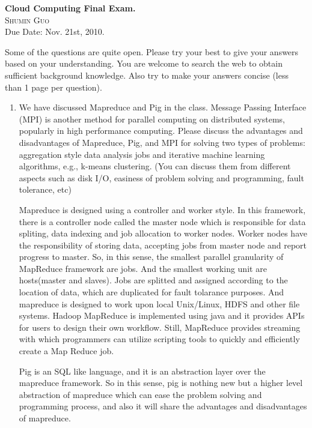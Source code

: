 \documentclass{article}
\begin{document}
\begin{center}
\textbf{\textup{\LARGE Cloud Computing Final Exam.}} \\
\textsc{Shumin Guo} \\
\small{Due Date: Nov. 21st, 2010.}
\end{center}

Some of the questions are quite open. Please try your best to give
your answers based on your understanding. You are welcome to search
the web to obtain sufficient background knowledge. Also try to make
your answers concise (less than 1 page per question).   

\begin{enumerate}
\item We have discussed Mapreduce and Pig in the class. Message Passing
Interface (MPI) is another method for parallel computing on
distributed systems, popularly in high performance computing. Please
discuss the advantages and disadvantages of Mapreduce, Pig, and MPI
for solving two types of problems: aggregation style data analysis
jobs and iterative machine learning algorithms, e.g., k-means
clustering. (You can discuss them from different aspects such as disk
I/O, easiness of problem solving and programming, fault tolerance,
etc)

Mapreduce is designed using a controller and worker style. In this
framework, there is a controller node called the master node which is
responsible for data spliting, data indexing and job allocation to
worker nodes. Worker nodes have the responsibility of storing data,
accepting jobs from master node and report progress to master. So, in
this sense, the smallest parallel granularity of MapReduce framework
are jobs. And the smallest working unit are hosts(master and
slaves). Jobs are splitted and assigned according to the location of 
data, which are duplicated for fault tolarance purposes. And mapreduce
is designed to work upon local Unix/Linux, HDFS and other file
systems. Hadoop MapReduce is implemented using java and it provides
APIs for users to design their own workflow. Still, MapReduce provides
streaming with which programmers can utilize scripting tools to
quickly and efficiently create a Map Reduce job. 

Pig is an SQL like language, and it is an abstraction layer over the
mapreduce framework. So in this sense, pig is nothing new but a higher
level abstraction of mapreduce which can ease the problem solving and
programming process, and also it will share the advantages and
disadvantages of mapreduce.


\end{enumerate}
\end{document}
